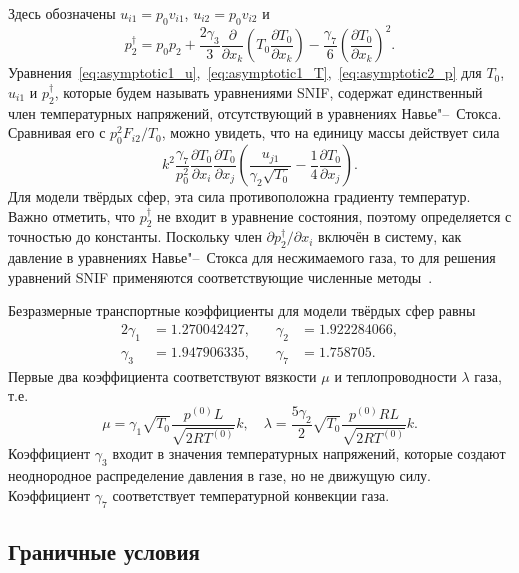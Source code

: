 \documentclass[10pt]{article}
\newcommand{\pder}[2][]{\frac{\partial#1}{\partial#2}}
\begin{document}
Здесь обозначены \(u_{i1} = p_0v_{i1}\), \(u_{i2} = p_0v_{i2}\) и
\begin{equation}\label{eq:dag_pressure}
    p_2^\dag = p_0 p_2
        + \frac{2\gamma_3}{3}\pder{x_k}\left(T_0\pder[T_0]{x_k}\right)
        - \frac{\gamma_7}{6}\left(\pder[T_0]{x_k}\right)^2.
\end{equation}
Уравнения~\eqref{eq:asymptotic1_u},~\eqref{eq:asymptotic1_T},~\eqref{eq:asymptotic2_p}
для \(T_0\), \(u_{i1}\) и \(p_2^\dag\), которые будем называть уравнениями SNIF,
содержат единственный член температурных напряжений, отсутствующий в уравнениях Навье"--~Стокса.
Сравнивая его с \(p_0^2F_{i2}/T_0\), можно увидеть, что на единицу массы действует сила
\begin{equation}\label{eq:gamma7_force}
    k^2\frac{\gamma_7}{p_0^2}\pder[T_0]{x_i}\pder[T_0]{x_j}\left(\frac{u_{j1}}{\gamma_2\sqrt{T_0}} - \frac{1}4\pder[T_0]{x_j}\right).
\end{equation}
Для модели твёрдых сфер, эта сила противоположна градиенту температур.
Важно отметить, что \(p_2^\dag\) не входит в уравнение состояния,
поэтому определяется с точностью до константы.
Поскольку член \(\partial{p_2^\dag}/\partial{x_i}\) включён в систему,
как давление в уравнениях Навье"--~Стокса для несжимаемого газа,
то для решения уравнений SNIF применяются соответствующие численные методы~\cite{Aoki2007}.

Безразмерные транспортные коэффициенты для модели твёрдых сфер равны
\begin{alignat*}{2}\label{eq:gamma_coeffs}
    \gamma_1 &= 1.270042427, &\quad \gamma_2 &= 1.922284066, \\
    \gamma_3 &= 1.947906335, &\quad \gamma_7 &= 1.758705.
\end{alignat*}
Первые два коэффициента соответствуют вязкости \(\mu\) и теплопроводности \(\lambda\) газа, т.е.
\begin{equation}\label{eq:mu_lambda}
    \mu = \gamma_1\sqrt{T_0} \frac{p^{(0)}L}{\sqrt{2RT^{(0)}}} k, \quad
    \lambda = \frac{5\gamma_2}{2}\sqrt{T_0} \frac{p^{(0)}RL}{\sqrt{2RT^{(0)}}} k.
\end{equation}
Коэффициент \(\gamma_3\) входит в значения температурных напряжений,
которые создают неоднородное распределение давления в газе,
но не движущую силу. Коэффициент \(\gamma_7\) соответствует
температурной конвекции газа.

\subsection{Граничные условия}
\end{document}
